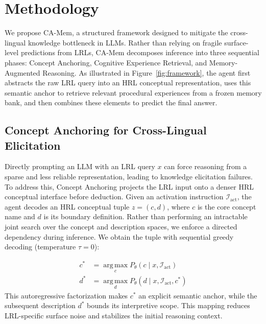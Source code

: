 \documentclass[11pt]{article}
\begin{document}
\section{Methodology}



We propose CA-Mem, a structured framework designed to mitigate the cross-lingual knowledge bottleneck in LLMs.
Rather than relying on fragile surface-level predictions from LRLs, CA-Mem decomposes inference into three sequential phases: Concept Anchoring, Cognitive Experience Retrieval, and Memory-Augmented Reasoning.
As illustrated in Figure~\ref{fig:framework}, the agent first abstracts the raw LRL query into an HRL conceptual representation, uses this semantic anchor to retrieve relevant procedural experiences from a frozen memory bank, and then combines these elements to predict the final answer.


\subsection{Concept Anchoring for Cross-Lingual Elicitation}

Directly prompting an LLM with an LRL query $x$ can force reasoning from a sparse and less reliable representation, leading to knowledge elicitation failures.
To address this, Concept Anchoring projects the LRL input onto a denser HRL conceptual interface before deduction.
Given an activation instruction $\mathcal{I}_{\mathrm{act}}$, the agent decodes an HRL conceptual tuple $z = (c, d)$, where $c$ is the core concept name and $d$ is its boundary definition.
Rather than performing an intractable joint search over the concept and description spaces, we enforce a directed dependency during inference.
We obtain the tuple with sequential greedy decoding (temperature $\tau=0$):

\begin{align}
    c^* &= \operatorname*{arg\,max}_{c} P_\theta(c \mid x, \mathcal{I}_{\mathrm{act}}) \\
    d^* &= \operatorname*{arg\,max}_{d} P_\theta(d \mid x, \mathcal{I}_{\mathrm{act}}, c^*)
\end{align}
This autoregressive factorization makes $c^*$ an explicit semantic anchor, while the subsequent description $d^*$ bounds its interpretive scope.
This mapping reduces LRL-specific surface noise and stabilizes the initial reasoning context.
\end{document}
